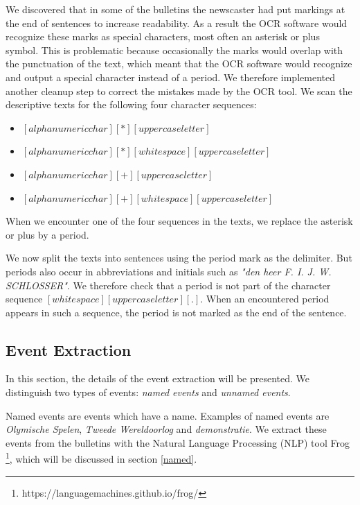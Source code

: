 \documentclass[a4paper, 10pt, conference]{ieeeconf}      %
\begin{document}
We discovered that in some of the bulletins the newscaster had put markings at the end of sentences to increase readability. As a result the OCR software would recognize these marks as special characters, most often an asterisk or plus symbol. This is problematic because occasionally the marks would overlap with the punctuation of the text, which meant that the OCR software would recognize and output a special character instead of a period. We therefore implemented another cleanup step to correct the mistakes made by the OCR tool. We scan the descriptive texts for the following four character sequences:

\begin{itemize}
\item $[alphanumeric char][*][uppercase letter]$
\item $[alphanumeric char][*][whitespace][uppercase letter]$
\item $[alphanumeric char][+][uppercase letter]$
\item $[alphanumeric char][+][whitespace][uppercase letter]$
\end{itemize}
When we encounter one of the four sequences in the texts, we replace the asterisk or plus by a period. 

We now split the texts into sentences using the period mark as the delimiter. But periods also occur in abbreviations and initials such as \textit{"den heer F. I. J. W. SCHLOSSER"}. We therefore check that a period is not part of the character sequence $[whitespace][uppercase letter][.]$. When an encountered period appears in such a sequence, the period is not marked as the end of the sentence.


\subsection{Event Extraction}\label{extraction}
In this section, the details of the event extraction will be presented. We distinguish two types of events: \textit{named events} and \textit{unnamed events}. 

Named events are events which have a name. Examples of named events are \textit{Olymische Spelen}, \textit{Tweede Wereldoorlog} and \textit{demonstratie}. We extract these events from the bulletins with the Natural Language Processing (NLP) tool Frog \footnote{https://languagemachines.github.io/frog/}, which will be discussed in section \ref{named}. 
\end{document}

